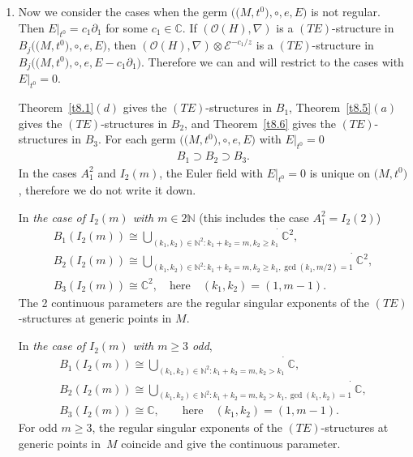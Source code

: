 \documentclass[pdftex]{sigma}%
\numberwithin{equation}{section}
\numberwithin{figure}{section}
\newcommand{\N}{{\mathbb N}}
\newcommand{\C}{{\mathbb C}}
\newcommand{\EE}{{\mathcal E}}
\newcommand{\OO}{{\mathcal O}}
\newcommand{\paa}{\partial}
\newcommand{\nnn}{\nabla}
\begin{document}
\begin{Remarks}
\begin{enumerate}
Corollary~\ref{t4.18} gives the countably many components
for type (Reg). One is 1-dimensional, the others are
2-dimensional.

\item[$(ii)$] Now we consider the cases when the germ
$\big(\big(M,t^0\big),\circ,e,E\big)$ is not regular.
Then $E|_{t^0}=c_1\paa_1$ for some $c_1\in\C$.
If $(\OO(H),\nnn)$ is a $(TE)$-structure in
$B_j\big(\big(M,t^0\big),\circ,e,E\big)$, then
$(\OO(H),\nnn)\otimes \EE^{-c_1/z}$ is a $(TE)$-structure in
$B_j\big(\big(M,t^0\big),\circ,e,E-c_1\paa_1\big)$.
Therefore we can and will restrict to the cases with
$E|_{t^0}=0$.

Theorem~\ref{t8.1}$(d)$ gives the $(TE)$-structures in $B_1$,
Theorem~\ref{t8.5}$(a)$ gives the $(TE)$-structures in $B_2$,
and Theorem~\ref{t8.6} gives the $(TE)$-structures in $B_3$.
For each germ $\big(\big(M,t^0\big),\circ,e,E\big)$ with $E|_{t^0}=0$
\begin{gather*}%
B_1\supset B_2\supset B_3.
\end{gather*}
In the cases $A_1^2$ and $I_2(m)$, the Euler field with
$E|_{t^0}=0$ is unique on $\big(M,t^0\big)$, therefore we do not
write it down.

In {\it the case of $I_2(m)$ with $m\in 2\N$} (this includes
the case $A_1^2=I_2(2)$)
\begin{gather}
B_1(I_2(m))\cong \dot{\bigcup\limits_{(k_1,k_2)\in\N^2\colon
k_1+k_2=m,k_2\geq k_1}}\C^2,\nonumber
\\
B_2(I_2(m))\cong \dot{\bigcup\limits_{(k_1,k_2)\in\N^2\colon
k_1+k_2=m,k_2\geq k_1,\gcd(k_1,m/2)=1}}\C^2, \nonumber
\\
B_3(I_2(m))\cong \C^2,\quad\text{here}\quad(k_1,k_2)=(1,m-1).
\label{8.17}
\end{gather}
The 2 continuous parameters are the regular singular exponents of the
$(TE)$-structures at generic points in $M$.

In {\it the case of $I_2(m)$ with $m\geq 3$ odd},
\begin{gather}
B_1(I_2(m))\cong \dot{\bigcup\limits_{(k_1,k_2)\in\N^2\colon
k_1+k_2=m,k_2>k_1}}\C,\nonumber
\\
B_2(I_2(m))\cong \dot{\bigcup\limits_{(k_1,k_2)\in\N^2\colon
k_1+k_2=m,k_2>k_1,\gcd(k_1,k_2)=1}}\C, \nonumber
\\
B_3(I_2(m))\cong\C, \qquad\text{here}\quad (k_1,k_2)=(1,m-1).
\label{8.18}
\end{gather}
For odd $m\geq 3$, the regular singular exponents of the
$(TE)$-structures at generic points in~$M$ coincide and
give the continuous parameter.


\end{enumerate}
\end{Remarks}
\end{document}
